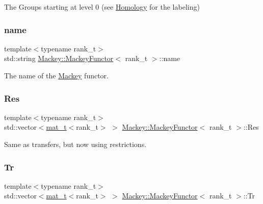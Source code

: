 The Groups starting at level 0 (see \hyperlink{classMackey_1_1Homology}{Homology} for the labeling) 

\mbox{\label{classMackey_1_1MackeyFunctor_ae1d69a215249d8b1018ac810ecc63d56}} 
\subsubsection{\texorpdfstring{name}{name}}
{\footnotesize\ttfamily template$<$typename rank\+\_\+t$>$ \\
std\+::string \hyperlink{classMackey_1_1MackeyFunctor}{Mackey\+::\+Mackey\+Functor}$<$ rank\+\_\+t $>$\+::name}



The name of the \hyperlink{namespaceMackey}{Mackey} functor. 

\mbox{\label{classMackey_1_1MackeyFunctor_aa017d427a7ca062c2fe974c3930de6d8}} 
\subsubsection{\texorpdfstring{Res}{Res}}
{\footnotesize\ttfamily template$<$typename rank\+\_\+t$>$ \\
std\+::vector$<$\hyperlink{namespaceMackey_a035386035757dade630f685e508e5cf9}{mat\+\_\+t}$<$rank\+\_\+t$>$ $>$ \hyperlink{classMackey_1_1MackeyFunctor}{Mackey\+::\+Mackey\+Functor}$<$ rank\+\_\+t $>$\+::Res}



Same as transfers, but now using restrictions. 

\mbox{\label{classMackey_1_1MackeyFunctor_aeb319977f08791ff220d647cbf460c6c}} 
\subsubsection{\texorpdfstring{Tr}{Tr}}
{\footnotesize\ttfamily template$<$typename rank\+\_\+t$>$ \\
std\+::vector$<$\hyperlink{namespaceMackey_a035386035757dade630f685e508e5cf9}{mat\+\_\+t}$<$rank\+\_\+t$>$ $>$ \hyperlink{classMackey_1_1MackeyFunctor}{Mackey\+::\+Mackey\+Functor}$<$ rank\+\_\+t $>$\+::Tr}



